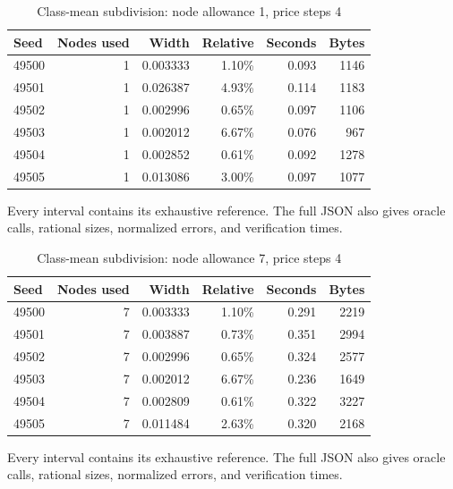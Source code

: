 \begin{table}[p]\centering
\caption{Class-mean subdivision: node allowance 1, price steps 4}\label{tab:group1ec52}
\setlength{\tabcolsep}{4pt}
\begin{tabular}{lrrrrr}
\toprule
Seed & Nodes used & Width & Relative & Seconds & Bytes\\
\midrule
49500 & 1 & 0.003333 & 1.10\% & 0.093 & 1146\\
49501 & 1 & 0.026387 & 4.93\% & 0.114 & 1183\\
49502 & 1 & 0.002996 & 0.65\% & 0.097 & 1106\\
49503 & 1 & 0.002012 & 6.67\% & 0.076 & 967\\
49504 & 1 & 0.002852 & 0.61\% & 0.092 & 1278\\
49505 & 1 & 0.013086 & 3.00\% & 0.097 & 1077\\
\bottomrule\end{tabular}
\par\vspace{6pt}\begin{minipage}{\textwidth}Every interval contains its exhaustive reference. The full JSON also gives oracle calls, rational sizes, normalized errors, and verification times.\end{minipage}
\end{table}
\begin{table}[p]\centering
\caption{Class-mean subdivision: node allowance 7, price steps 4}\label{tab:group7ec52}
\setlength{\tabcolsep}{4pt}
\begin{tabular}{lrrrrr}
\toprule
Seed & Nodes used & Width & Relative & Seconds & Bytes\\
\midrule
49500 & 7 & 0.003333 & 1.10\% & 0.291 & 2219\\
49501 & 7 & 0.003887 & 0.73\% & 0.351 & 2994\\
49502 & 7 & 0.002996 & 0.65\% & 0.324 & 2577\\
49503 & 7 & 0.002012 & 6.67\% & 0.236 & 1649\\
49504 & 7 & 0.002809 & 0.61\% & 0.322 & 3227\\
49505 & 7 & 0.011484 & 2.63\% & 0.320 & 2168\\
\bottomrule\end{tabular}
\par\vspace{6pt}\begin{minipage}{\textwidth}Every interval contains its exhaustive reference. The full JSON also gives oracle calls, rational sizes, normalized errors, and verification times.\end{minipage}
\end{table}
